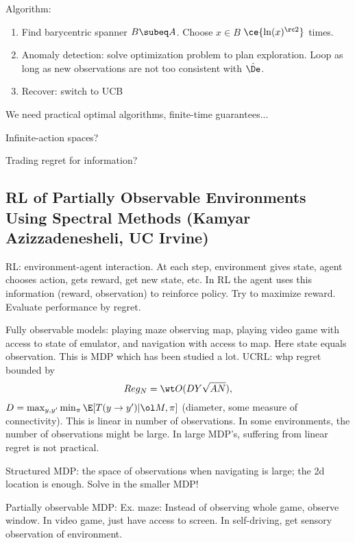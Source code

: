 Algorithm:
\begin{enumerate}
\item
Find barycentric spanner $B\subeq A$.
Choose $x\in B$ $\ce{\ln(x)^{\rc 2}}$ times.
\item
Anomaly detection: solve optimization problem to plan exploration. 
Loop as long as new observations are not too consistent with $\hat \De$.
\item
Recover: switch to UCB
\end{enumerate}

We need practical optimal algorithms, finite-time guarantees...

Infinite-action spaces?

Trading regret for information?

\subsection{RL of Partially Observable Environments Using Spectral Methods
(Kamyar Azizzadenesheli, UC Irvine)}

RL: environment-agent interaction. At each step, environment gives state, agent chooses action, gets reward, get new state, etc. In RL the agent uses this information (reward, observation) to reinforce policy. Try to maximize reward. Evaluate performance by regret.

Fully observable models: playing maze observing map, playing video game with access to state of emulator, and navigation with access to map. Here state equals observation. This is MDP which has been studied a lot. UCRL: whp regret bounded by $$Reg_N=\wt O(DY\sqrt{AN}),$$ $D=\max_{y,y'}\min_\pi \E[T(y\to y')|\ol M,\pi]$ (diameter, some measure of connectivity). 
This is linear in number of observations.
In some environments, the number of observations might be large. In large MDP's, suffering from linear regret is not practical.

Structured MDP: the space of observations when navigating is large; the 2d location is enough. Solve in the smaller MDP!

Partially observable MDP: Ex. maze: Instead of observing whole game, observe window. In video game, just have access to screen. In self-driving, get sensory observation of environment.

